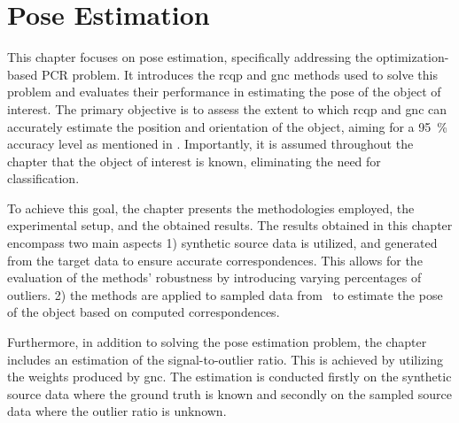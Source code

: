 \chapter{Pose Estimation}\label{ch:2-pose-estimation}

This chapter focuses on pose estimation, specifically addressing the optimization-based PCR problem. It introduces the \gls{rcqp} and \gls{gnc} methods used to solve this problem and evaluates their performance in estimating the pose of the object of interest. The primary objective is to assess the extent to which \gls{rcqp} and \gls{gnc} can accurately estimate the position and orientation of the object, aiming for a \SI{95}{\percent} accuracy level as mentioned in . Importantly, it is assumed throughout the chapter that the object of interest is known, eliminating the need for classification.\medskip

To achieve this goal, the chapter presents the methodologies employed, the experimental setup, and the obtained results. The results obtained in this chapter encompass two main aspects 1) synthetic source data is utilized, and generated from the target data to ensure accurate correspondences. This allows for the evaluation of the methods' robustness by introducing varying percentages of outliers. 2) the methods are applied to sampled data from~ to estimate the pose of the object based on computed correspondences.\medskip

Furthermore, in addition to solving the pose estimation problem, the chapter includes an estimation of the signal-to-outlier ratio. This is achieved by utilizing the weights produced by \gls{gnc}. The estimation is conducted firstly on the synthetic source data where the ground truth is known and secondly on the sampled source data where the outlier ratio is unknown.


